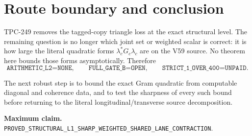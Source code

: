 \documentclass[11pt]{article}
\theoremstyle{remark}
\begin{document}
\section{Route boundary and conclusion}

TPC-249 removes the tagged-copy triangle loss at the exact structural level.
The remaining question is no longer which joint set or weighted scalar is
correct: it is how large the literal quadratic forms
$\lambda_c^*G_c\lambda_c$ are on the V59 source.  No theorem here bounds those
forms asymptotically.  Therefore
\[
 \texttt{ARITHMETIC\_L2=NONE},\qquad
 \texttt{FULL\_GATE\_B=OPEN},\qquad
 \texttt{STRICT\_1\_OVER\_400=UNPAID}.
\]

The next robust step is to bound the exact Gram quadratic from computable
diagonal and coherence data, and to test the sharpness of every such bound
before returning to the literal longitudinal/transverse source decomposition.

\medskip
\noindent\textbf{Maximum claim.}
\texttt{PROVED\_STRUCTURAL\_L1\_SHARP\_WEIGHTED\_SHARED\_LANE\_CONTRACTION}.



\end{document}
